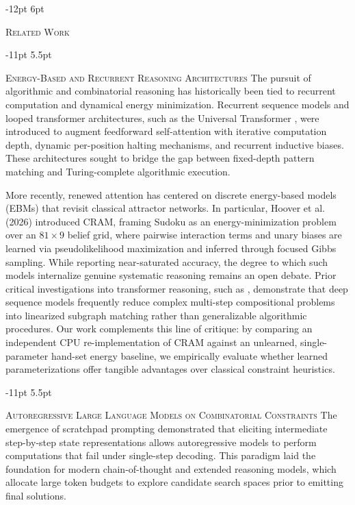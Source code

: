 \documentclass{article} %
\makeatletter
\renewcommand\section{\@startsection{section}{1}{\z@}%
  {-12pt \@plus -3pt \@minus -2pt}%
  {6pt \@plus 2pt}%
  {\normalfont\fontsize{12}{14}\selectfont\scshape\raggedright}}
\renewcommand\subsection{\@startsection{subsection}{2}{\z@}%
  {-11pt \@plus -3pt \@minus -2pt}%
  {5.5pt \@plus 2pt}%
  {\normalfont\fontsize{10}{12}\selectfont\scshape\raggedright}}
\makeatother
\begin{document}
\section{\textsc{Related Work}}
\label{sec:related_work}

\subsection{\textsc{Energy-Based and Recurrent Reasoning Architectures}}
The pursuit of algorithmic and combinatorial reasoning has historically been tied to recurrent computation and dynamical energy minimization. Recurrent sequence models and looped transformer architectures, such as the Universal Transformer \citep{Dehghani2018UniversalTransformers}, were introduced to augment feedforward self-attention with iterative computation depth, dynamic per-position halting mechanisms, and recurrent inductive biases. These architectures sought to bridge the gap between fixed-depth pattern matching and Turing-complete algorithmic execution.

More recently, renewed attention has centered on discrete energy-based models (EBMs) that revisit classical attractor networks. In particular, Hoover et al. (2026) introduced CRAM, framing Sudoku as an energy-minimization problem over an $81 \times 9$ belief grid, where pairwise interaction terms and unary biases are learned via pseudolikelihood maximization and inferred through focused Gibbs sampling. While reporting near-saturated accuracy, the degree to which such models internalize genuine systematic reasoning remains an open debate. Prior critical investigations into transformer reasoning, such as \citet{Dziri2023FaithFate}, demonstrate that deep sequence models frequently reduce complex multi-step compositional problems into linearized subgraph matching rather than generalizable algorithmic procedures. Our work complements this line of critique: by comparing an independent CPU re-implementation of CRAM against an unlearned, single-parameter hand-set energy baseline, we empirically evaluate whether learned parameterizations offer tangible advantages over classical constraint heuristics.

\subsection{\textsc{Autoregressive Large Language Models on Combinatorial Constraints}}
The emergence of scratchpad prompting \citep{Nye2021ShowYour} demonstrated that eliciting intermediate step-by-step state representations allows autoregressive models to perform computations that fail under single-step decoding. This paradigm laid the foundation for modern chain-of-thought and extended reasoning models, which allocate large token budgets to explore candidate search spaces prior to emitting final solutions.
\end{document}
